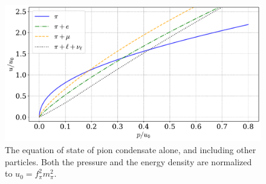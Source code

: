\begin{figure}[!htb]
    \centering
    \includegraphics[width=.8\textwidth]{../scripts/figurer/pion_star/pion_all_eos.pdf}
    \caption{
        The equation of state of pion condensate alone, and including other particles.
        Both the pressure and the energy density are normalized to $u_0 = f_\pi^2 m_\pi^2$.
    }
    \label{fig: all eos}
\end{figure}
